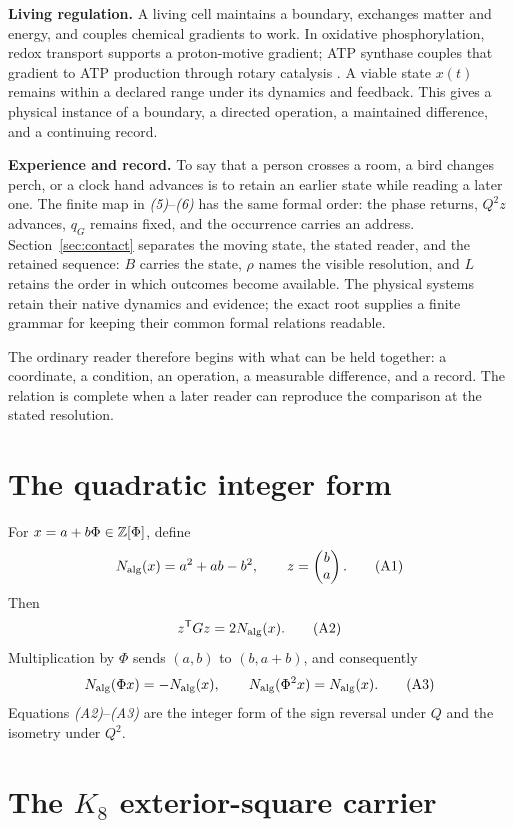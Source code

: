 \medskip
\noindent\textbf{Living regulation.}  A living cell maintains a boundary,
exchanges matter and energy, and couples chemical gradients to work.  In
oxidative phosphorylation, redox transport supports a proton-motive gradient;
ATP synthase couples that gradient to ATP production through rotary catalysis
\cite{mitchell,alberts}.  A viable state $x(t)$ remains within a declared
range under its dynamics and feedback.  This gives a physical instance of a
boundary, a directed operation, a maintained difference, and a continuing
record.

\medskip
\noindent\textbf{Experience and record.}  To say that a person crosses a
room, a bird changes perch, or a clock hand advances is to retain an earlier
state while reading a later one.  The finite map in \emph{(5)}--\emph{(6)}
has the same formal order: the phase returns, $Q^2z$ advances, $q_G$ remains
fixed, and the occurrence carries an address.  Section~\ref{sec:contact}
separates the moving state, the stated reader, and the retained sequence:
$B$ carries the state, $\rho$ names the visible resolution, and $L$ retains
the order in which outcomes become available.  The physical systems retain
their native dynamics and evidence; the exact root supplies a finite grammar
for keeping their common formal relations readable.

The ordinary reader therefore begins with what can be held together: a
coordinate, a condition, an operation, a measurable difference, and a record.
The relation is complete when a later reader can reproduce the comparison at
the stated resolution.

\clearpage
\appendix

\section{The quadratic integer form}

For $x=a+b\Phi\in\mathbb Z[\Phi]$, define
\[
N_{\rm alg}(x)=a^2+ab-b^2,\qquad
z=\begin{pmatrix}b\\a\end{pmatrix}.
\tag{A1}
\]
Then
\[
z^{\mathsf T}Gz=2N_{\rm alg}(x).
\tag{A2}
\]
Multiplication by $\Phi$ sends $(a,b)$ to $(b,a+b)$, and consequently
\[
N_{\rm alg}(\Phi x)=-N_{\rm alg}(x),\qquad
N_{\rm alg}(\Phi^2x)=N_{\rm alg}(x).
\tag{A3}
\]
Equations \emph{(A2)}--\emph{(A3)} are the integer form of the sign reversal
under $Q$ and the isometry under $Q^2$.

\section{The \texorpdfstring{$K_8$}{K8} exterior-square carrier}

